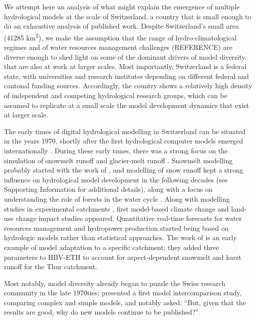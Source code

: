 \documentclass[10pt,a4paper]{article}
\begin{document}
We attempt here an analysis of what might explain the emergence of multiple hydrological models at the scale of Switzerland, a country that is small enough to do an exhaustive analysis of published work. Despite Switzerland's small area (41285 km\textsuperscript{2}), we make the assumption that the range of hydro-climatological regimes \citep{Aschwanden1985} and of water resources management challenges (REFERENCE) are diverse enough to shed light on some of the dominant drivers of model diversity that are also at work at larger scales. Most importantly, Switzerland is a federal state, with universities and research institutes depending on different federal and cantonal funding sources. Accordingly, the country shows a relatively high density of independent and competing hydrological research groups, which can be assumed to replicate at a small scale the model development dynamics that exist at larger scale.

The early times of digital hydrological modelling in Switzerland can be situated in the years 1970, shortly after the first hydrological computer models emerged internationally \citep{Peel2020}. During these early times, there was a strong focus on the simulation of snowmelt runoff \citep{Martinec1970, Braun1986} and glacier-melt runoff \citep{Braun1990}. Snowmelt modelling probably started with the work of \citet{Hoeck1952}, and modelling of snow runoff kept a strong influence on hydrological model development in the following decades (see Supporting Information for additional details), along with a focus on understanding the role of forests in the water cycle \citep{Keller1991, Forster1989}. Along with modelling studies in experimental catchments \citep{Iorgulescu1994}, first model-based climate change \citep{Bultot1992a} and land-use change \citep{Jordan1990a} impact studies appeared. Quantitative real-time forecasts for water resources management \citep{Lugiez1969} and hydropower production \citep{Jensenlang1973} started being based on hydrologic models rather than statistical approaches. The work of \citet{Hottelet1993} is an early example of model adaptation to a specific catchment; they added three parameters to HBV-ETH to account for aspect-dependent snowmelt and karst runoff for the Thur catchment.

Most notably, model diversity already began to puzzle the Swiss research community in the late 1970ties; \citet{Naef1977} presented a first model intercomparison study, comparing complex and simple models, and \citet{Naef1981} notably asked: ``But, given that the results are good, why do new models continue to be published?''
\end{document}
